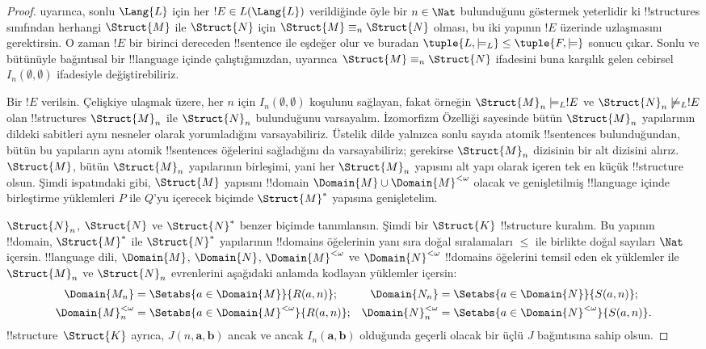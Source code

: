 \begin{proof}
 uyarınca, sonlu $\Lang{L}$ için her
$!E\in L(\Lang{L})$ verildiğinde öyle bir $n\in\Nat$ bulunduğunu göstermek
yeterlidir ki !!{structure}s sınıfından herhangi $\Struct{M}$ ile
$\Struct{N}$ için
$\Struct{M}\equiv_n\Struct{N}$ olması, bu iki yapının $!E$ üzerinde
uzlaşmasını gerektirsin. O zaman $!E$ bir birinci dereceden !!{sentence}
ile eşdeğer olur ve buradan
$\tuple{L,\models_L}\leq\tuple{F,\models}$ sonucu çıkar. Sonlu ve bütünüyle
bağıntısal bir !!{language} içinde çalıştığımızdan,
 uyarınca
$\Struct{M}\equiv_n\Struct{N}$ ifadesini buna karşılık gelen cebirsel
$I_n(\emptyset,\emptyset)$ ifadesiyle değiştirebiliriz.

Bir $!E$ verilsin. Çelişkiye ulaşmak üzere, her $n$ için
$I_n(\emptyset,\emptyset)$ koşulunu sağlayan, fakat örneğin
$\Struct{M}_n\models_L !E$ ve $\Struct{N}_n\not\models_L !E$ olan
!!{structure}s $\Struct{M}_n$ ile $\Struct{N}_n$ bulunduğunu varsayalım.
İzomorfizm Özelliği sayesinde bütün $\Struct{M}_n$ yapılarının dildeki
sabitleri aynı nesneler olarak yorumladığını varsayabiliriz. Üstelik dilde
yalnızca sonlu sayıda atomik !!{sentence}s bulunduğundan, bütün bu yapıların
aynı atomik !!{sentence}s öğelerini sağladığını da varsayabiliriz; gerekirse
$\Struct{M}_n$ dizisinin bir alt dizisini alırız. $\Struct{M}$, bütün
$\Struct{M}_n$ yapılarının birleşimi, yani her $\Struct{M}_n$ yapısını alt
yapı olarak içeren tek en küçük !!{structure} olsun. Şimdi
 ispatındaki gibi, $\Struct{M}$ yapısını
!!{domain} $\Domain{M}\cup\Domain{M}^{<\omega}$ olacak ve genişletilmiş
!!{language} içinde birleştirme yüklemleri $P$ ile $Q$'yu içerecek biçimde
$\Struct{M}^*$ yapısına genişletelim.

$\Struct{N}_n$, $\Struct{N}$ ve $\Struct{N}^*$ benzer biçimde tanımlansın.
Şimdi bir $\Struct{K}$ !!{structure} kuralım. Bu yapının !!{domain},
$\Struct{M}^*$ ile $\Struct{N}^*$ yapılarının !!{domain}s öğelerinin yanı
sıra doğal sıralamaları $\leq$ ile birlikte doğal sayıları $\Nat$ içersin.
!!{language} dili, $\Domain{M}$, $\Domain{N}$,
$\Domain{M}^{<\omega}$ ve $\Domain{N}^{<\omega}$ !!{domain}s öğelerini
temsil eden ek yüklemler ile $\Struct{M}_n$ ve $\Struct{N}_n$ evrenlerini
aşağıdaki anlamda kodlayan yüklemler içersin:
\begin{align*}
  \Domain{M_n} & = \Setabs{a\in\Domain{M}}{R(a,n)}; &
  \Domain{N_n} & = \Setabs{a\in\Domain{N}}{S(a,n)}; \\
  \Domain{M}^{<\omega}_n & =
    \Setabs{a\in\Domain{M}^{<\omega}}{R(a,n)}; &
  \Domain{N}^{<\omega}_n & =
    \Setabs{a\in\Domain{N}^{<\omega}}{S(a,n)}.
\end{align*}
!!{structure}~$\Struct{K}$ ayrıca, $J(n,\mathbf a,\mathbf b)$ ancak ve
ancak $I_n(\mathbf a,\mathbf b)$ olduğunda geçerli olacak bir üçlü $J$
bağıntısına sahip olsun.


\end{proof}
